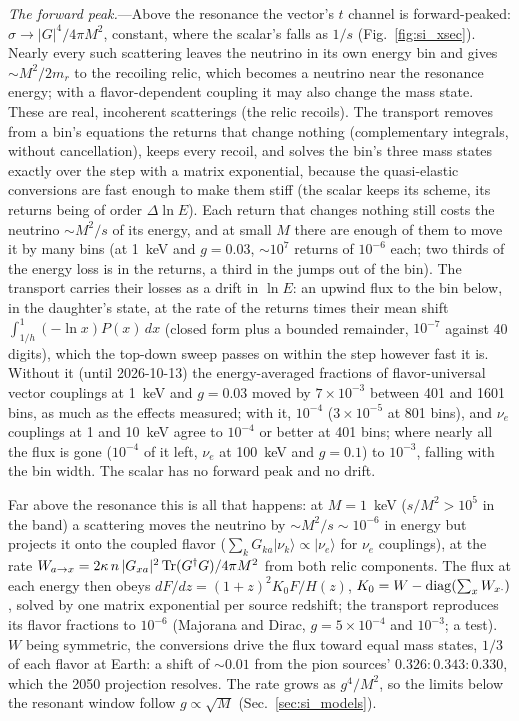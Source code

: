 \documentclass[11pt,a4paper]{article}
\begin{document}
\textit{The forward peak.}---Above the resonance the vector's $t$ channel is forward-peaked:
$\sigma\to|G|^4/4\pi M^2$, constant, where the scalar's falls as $1/s$ (Fig.~\ref{fig:si_xsec}).
Nearly every such scattering leaves the neutrino in its own energy bin and gives $\sim M^2/2m_r$ to
the recoiling relic, which becomes a neutrino near the resonance energy; with a flavor-dependent
coupling it may also change the mass state. These are real, incoherent scatterings (the relic
recoils). The transport removes from a bin's equations the returns that change nothing (complementary
integrals, without cancellation), keeps every recoil, and solves the bin's three mass states exactly
over the step with a matrix exponential, because the quasi-elastic conversions are fast enough to
make them stiff (the scalar keeps its scheme, its returns being of order $\Delta\ln E$).
Each return that changes nothing still costs the neutrino $\sim M^2/s$ of its energy, and at small
$M$ there are enough of them to move it by many bins (at 1~keV and $g = 0.03$, $\sim10^7$ returns
of $10^{-6}$ each; two thirds of the energy loss is in the returns, a third in the jumps out of the
bin). The transport carries their losses as a drift in $\ln E$: an upwind flux to the bin below, in
the daughter's state, at the rate of the returns times their mean shift
$\int_{1/h}^1(-\ln x)P(x)\,dx$ (closed form plus a bounded remainder, $10^{-7}$ against 40 digits),
which the top-down sweep passes on within the step however fast it is. Without it (until
2026-10-13) the energy-averaged fractions of flavor-universal vector couplings at 1~keV and
$g = 0.03$ moved by $7\times10^{-3}$ between 401 and 1601 bins, as much as the effects measured;
with it, $10^{-4}$ ($3\times10^{-5}$ at 801 bins), and $\nu_e$ couplings at 1 and 10~keV agree to $10^{-4}$ or better at 401 bins; where nearly all the flux is gone ($10^{-4}$ of it left, $\nu_e$ at 100~keV and $g = 0.1$) to $10^{-3}$, falling with the bin width. The scalar has no forward peak and no drift.

Far above the resonance this is all that happens: at $M = 1$~keV ($s/M^2 > 10^5$ in the band) a
scattering moves the neutrino by $\sim M^2/s\sim10^{-6}$ in energy but projects it onto the
coupled flavor ($\sum_k G_{ka}|\nu_k\rangle\propto|\nu_e\rangle$ for $\nu_e$ couplings), at the rate
$W_{a\to x} = 2\kappa\, n\,|G_{xa}|^2\,{\rm Tr}(G^\dagger G)/4\pi M^2$ from both relic components.
The flux at each energy then obeys $dF/dz = (1+z)^2 K_0F/H(z)$, $K_0 = W - {\rm diag}(\sum_xW_{x\cdot})$,
solved by one matrix exponential per source redshift; the transport reproduces its flavor
fractions to $10^{-6}$ (Majorana and Dirac, $g = 5\times10^{-4}$ and $10^{-3}$; a test). $W$ being
symmetric, the conversions drive the flux toward equal mass states, $1/3$ of each flavor at Earth:
a shift of $\sim0.01$ from the pion sources' $0.326:0.343:0.330$, which the 2050 projection
resolves. The rate grows as $g^4/M^2$, so the limits below the resonant window follow
$g\propto\sqrt M$ (Sec.~\ref{sec:si_models}).
\end{document}
